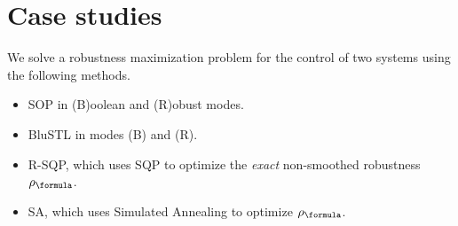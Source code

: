 \section{Case studies}
\label{sec:case study}

We solve a robustness maximization problem for the control of two systems using the following methods.

\begin{itemize}
	\vspace{-5pt}
	\item SOP in (B)oolean and (R)obust modes.
	\vspace{-5pt}
	\item BluSTL in modes (B) and (R).
	\item R-SQP, which uses SQP to optimize the \textit{exact} non-smoothed robustness $\robf$.
	\vspace{-5pt}
	\item SA, which uses Simulated Annealing to optimize $\robf$.%
	\vspace{-5pt}
\end{itemize}



